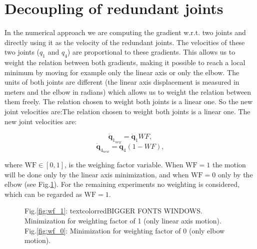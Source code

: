 \section{Decoupling of redundant joints}
\label{sec:Decoupling}
\label{subsubsec:weighting}




In the numerical approach we are computing the gradient w.r.t. two joints and directly using it as the velocity of the redundant joints. The velocities of these two joints ($q_1$ and $q_4$) are proportional to these gradients. This allows us to weight the relation between both gradients, making it possible to reach a local minimum
by moving for example only the linear axis or only the elbow. The units of both joints are different (the linear axis displacement is measured in meters and the elbow in radians) which allows us to weight the relation between them freely.
The relation chosen to weight both joints is a linear one. So the new joint velocities are:The relation chosen to weight both joints is a linear one. The new joint velocities are:

\begin{equation}
	\mathbf{\dot{q}}_{1_{new}}  = \mathbf{\dot{q}}_{1}WF,
	\label{eq:decoupling_q1} 
\end{equation} 
\begin{equation}
	\mathbf{\dot{q}}_{4_{new}} = \mathbf{\dot{q}}_{4}(1-WF),
	\label{eq:decoupling_q4}
\end{equation}


where $\mathrm{WF \in [0,1]}$, is the weighing factor variable.
When $\mathrm{WF=1}$ the motion will be done only by the linear axis minimization, and when $\mathrm{WF=0}$ only by the elbow (see Fig.\ref{fig:wf}).
For the  remaining experiments no weighting is considered, which can be regarded as $\mathrm{WF=1}$.

\begin{figure}[!h]
	\centering	
	 	 	 	
	\caption{Fig.\ref{fig:wf_1}: textcolor{red}{BIGGER FONTS WINDOWS.} Minimization for weighting factor of 1 (only  linear axis motion). \\ Fig.\ref{fig:wf_0}: Minimization for weighting factor of 0 (only elbow motion). }
	\label{fig:wf}
\end{figure}

